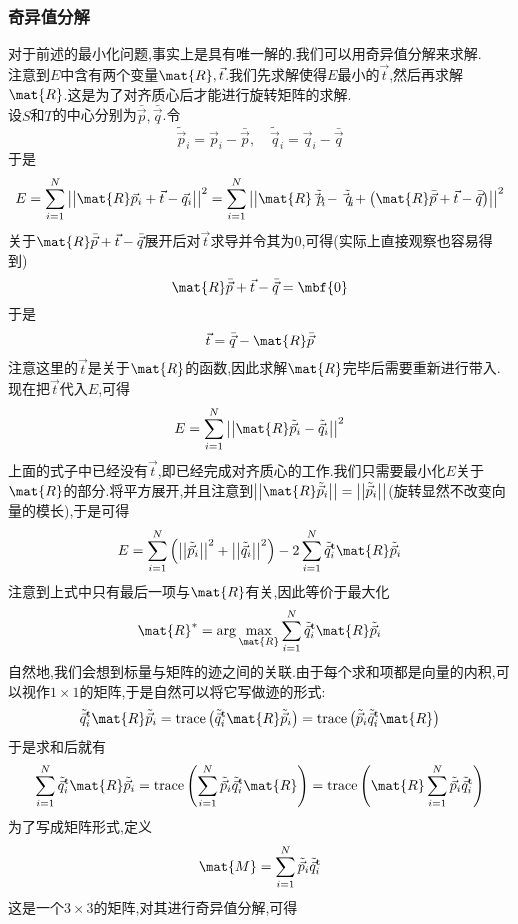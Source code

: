 \documentclass{ctexart}
\begin{document}
\subsubsection{奇异值分解}
对于前述的最小化问题,事实上是具有唯一解的.我们可以用奇异值分解来求解.\\
\indent 注意到$E$中含有两个变量$\mat{R},\vec{t}$.我们先求解使得$E$最小的$\vec{t}$,然后再求解$\mat{R}$.这是为了对齐质心后才能进行旋转矩阵的求解.\\
\indent 设$S$和$T$的中心分别为$\bar{\vec{p}},\bar{\vec{q}}$.令
\[\tilde{\vec{p}}_i=\vec{p}_i-\bar{\vec{p}},\quad\tilde{\vec{q}}_i=\vec{q}_i-\bar{\vec{q}}\]
于是
\[E=\sum_{i=1}^{N}\left|\left|\mat{R}\vec{p}_i+\vec{t}-\vec{q}_i\right|\right|^2=\sum_{i=1}^{N}\left|\left|\mat{R}\tilde{\vec{p}_i}-\tilde{\vec{q}_i}+\left(\mat{R}\bar{\vec{p}}+\vec{t}-\bar{\vec{q}}\right)\right|\right|^2\]
关于$\mat{R}\bar{\vec{p}}+\vec{t}-\bar{\vec{q}}$展开后对$\vec{t}$求导并令其为$0$,可得(实际上直接观察也容易得到)
\[\mat{R}\bar{\vec{p}}+\vec{t}-\bar{\vec{q}}=\mbf{0}\]
于是
\[\vec{t}=\bar{\vec{q}}-\mat{R}\bar{\vec{p}}\]
注意这里的$\vec{t}$是关于$\mat{R}$的函数,因此求解$\mat{R}$完毕后需要重新进行带入.现在把$\vec{t}$代入$E$,可得
\[E=\sum_{i=1}^{N}\left|\left|\mat{R}\tilde{\vec{p}}_i-\tilde{\vec{q}}_i\right|\right|^2\]
上面的式子中已经没有$\vec{t}$,即已经完成对齐质心的工作.我们只需要最小化$E$关于$\mat{R}$的部分.将平方展开,并且注意到$\left|\left|\mat{R}\tilde{\vec{p}}_i\right|\right|=\left|\left|\tilde{\vec{p}}_i\right|\right|$(旋转显然不改变向量的模长),于是可得
\[E=\sum_{i=1}^{N}\left(\left|\left|\tilde{\vec{p}}_i\right|\right|^2+\left|\left|\tilde{\vec{q}}_i\right|\right|^2\right)-2\sum_{i=1}^{N}\tilde{\vec{q}}_i^{\text{t}}\mat{R}\tilde{\vec{p}}_i\]
注意到上式中只有最后一项与$\mat{R}$有关,因此等价于最大化
\[\mat{R}^{\ast}=\arg\max_{\mat{R}}\sum_{i=1}^{N}\tilde{\vec{q}}_i^{\text{t}}\mat{R}\tilde{\vec{p}}_i\]
自然地,我们会想到标量与矩阵的迹之间的关联.由于每个求和项都是向量的内积,可以视作$1\times1$的矩阵,于是自然可以将它写做迹的形式:
\[\tilde{\vec{q}}_i^{\text{t}}\mat{R}\tilde{\vec{p}}_i=\text{trace}\left(\tilde{\vec{q}}_i^{\text{t}}\mat{R}\tilde{\vec{p}}_i\right)=\text{trace}\left(\tilde{\vec{p}}_i\tilde{\vec{q}}_i^{\text{t}}\mat{R}\right)\]
于是求和后就有
\[\sum_{i=1}^{N}\tilde{\vec{q}}_i^{\text{t}}\mat{R}\tilde{\vec{p}}_i=\text{trace}\left(\sum_{i=1}^{N}\tilde{\vec{p}}_i\tilde{\vec{q}}_i^{\text{t}}\mat{R}\right)=\text{trace}\left(\mat{R}\sum_{i=1}^{N}\tilde{\vec{p}}_i\tilde{\vec{q}}_i^{\text{t}}\right)\]
为了写成矩阵形式,定义
\[\mat{M}=\sum_{i=1}^{N}\tilde{\vec{p}}_i\tilde{\vec{q}}_i^{\text{t}}\]
这是一个$3\times 3$的矩阵,对其进行奇异值分解,可得
\end{document}
